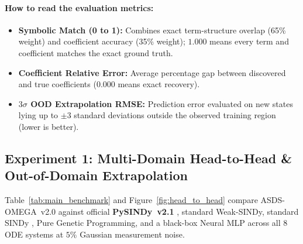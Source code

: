 \documentclass[11pt,a4paper]{article}
\begin{document}
\paragraph{How to read the evaluation metrics:}
\begin{itemize}
  \item \textbf{Symbolic Match (0 to 1):} Combines exact term-structure overlap (65\% weight) and coefficient accuracy (35\% weight); $1.000$ means every term and coefficient matches the exact ground truth.
  \item \textbf{Coefficient Relative Error:} Average percentage gap between discovered and true coefficients (0.000 means exact recovery).
  \item \textbf{$3\sigma$ OOD Extrapolation RMSE:} Prediction error evaluated on new states lying up to $\pm 3$ standard deviations outside the observed training region (lower is better).
\end{itemize}

\subsection{Experiment 1: Multi-Domain Head-to-Head \& Out-of-Domain Extrapolation}
Table~\ref{tab:main_benchmark} and Figure~\ref{fig:head_to_head} compare ASDS-OMEGA~v2.0 against official \textbf{PySINDy~v2.1} \cite{desilva2020pysindy}, standard Weak-SINDy, standard SINDy \cite{brunton2016discovering}, Pure Genetic Programming, and a black-box Neural MLP across all 8 ODE systems at $5\%$ Gaussian measurement noise.
\end{document}

